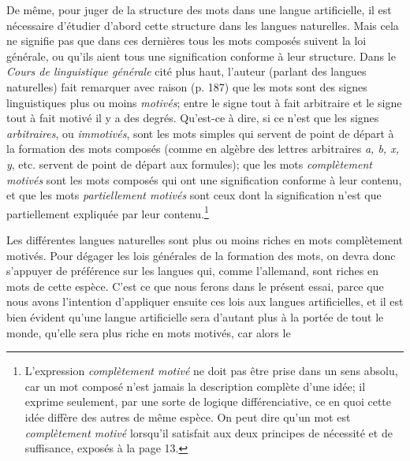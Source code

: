 {  De même, pour juger de la structure des mots dans une langue
  artificielle, il est nécessaire d’étudier d’abord cette structure
  dans les langues naturelles. Mais cela ne signifie pas que dans ces
  dernières tous les mots composés suivent la loi générale, ou qu’ils
  aient tous une signification conforme à leur structure. Dans le
  \emph{Cours de linguistique générale} cité plus haut, l’auteur
  (parlant des langues naturelles) fait remarquer avec raison (p. 187)
  que les mots sont des signes linguistiques plus ou moins
  \emph{motivés}; entre le signe tout à fait arbitraire et le signe
  tout à fait motivé il y a des degrés. Qu’est-ce à dire, si ce n’est
  que les signes \emph{arbitraires}, ou \emph{immotivés}, sont les
  mots simples qui servent de point de départ à la formation des mots
  composés (comme en algèbre des lettres arbitraires \emph{a, b, x,
    y}, etc. servent de point de départ aux formules); que les mots
  \emph{complètement motivés} sont les mots composés qui ont une
  signification conforme à leur contenu, et que les mots
  \emph{partiellement motivés} sont ceux dont la signification n’est
  que partiellement expliquée par leur contenu.\footnote{L’expression
    \emph{complètement motivé} ne doit pas être prise dans un sens absolu,
    car un mot composé n’est jamais la description complète d’une
    idée; il exprime seulement, par une sorte de logique
    différenciative, ce en quoi cette idée diffère des autres de même
    espèce. On peut dire qu’un mot est \emph{complètement motivé} lorsqu’il
    satisfait aux deux principes de nécessité et de suffisance,
    exposés à la page 13.}

  Les différentes langues naturelles sont plus ou moins riches en
  mots complètement motivés. Pour dégager les lois générales de la
  formation des mots, on devra donc s’appuyer de préférence sur les
  langues qui, comme l’allemand, sont riches en mots de cette
  espèce. C’est ce que nous ferons dans le présent essai, parce que
  nous avons l’intention d’appliquer ensuite ces lois aux langues
  artificielles, et il est bien évident qu’une langue artificielle
  sera d’autant plus à la portée de tout le monde, qu’elle sera plus
  riche en mots motivés, car alors le}

